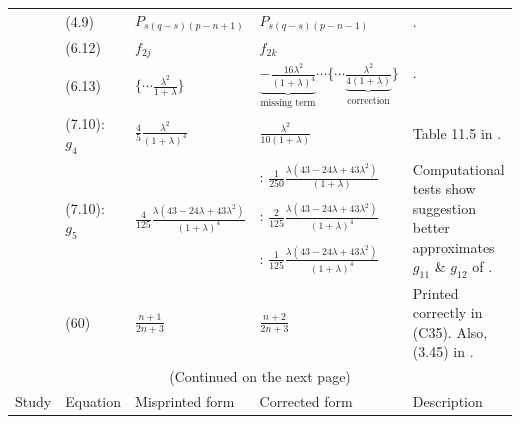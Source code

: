 \documentclass[../thesis.tex]{subfiles}
\begin{document}
\begin{landscape}
\begin{longtable}{p{3cm}p{3cm}p{5.0cm}p{5.25cm}p{5.5cm}}
 \multirow[t]{7}{3cm}{\cite{JO84}} & (4.9) & $P_{s(q-s)(p-n+1)}$ & $P_{s(q-s)(p-n-1)}$ & \cite{RWMG11,T17,I}.
 \\ \cline{2-5}
 & (6.12) & $f_{2j}$ & $f_{2k}$ & \multirow[c]{2}{5.5cm}{\cite{I}.}
 \\ \cline{2-4}
 & (6.13) & $\Big\{\cdots\frac{\lambda^2}{1+\lambda}\Big\}$ & $\underbrace{-\tfrac{16\lambda^2}{(1+\lambda)^4}}_\text{missing term}\cdots\Big\{\cdots\underbrace{\tfrac{\lambda^2}{4(1+\lambda)}}_\text{correction}\Big\}$ & 
 \\ \cline{2-5}
  & (7.10): $g_4$ & $\frac{4}{5}\frac{\lambda^2}{(1+\lambda)^4}$ & $\frac{\lambda^2}{10(1+\lambda)}$ & Table 11.5 in \cite{KK13}.
 \\ \cline{2-5}
 & \multirow[t]{3}{3cm}{(7.10): $g_5$} & \multirow[t]{3}{5.25cm}{$\frac{4}{125}\frac{\lambda(43-24\lambda+43\lambda^2)}{(1+\lambda)^4}$} & \cite{KK13}: $\frac{1}{250}\frac{\lambda(43-24\lambda+43\lambda^2)}{(1+\lambda)}$ & \multirow[t]{3}{5.5cm}{Computational tests show \cite{I} suggestion better approximates $g_{11}$ \& $g_{12}$ of \cite{ONM70}.} \\
 & & & \cite{L90}: $\frac{2}{125}\frac{\lambda(43-24\lambda+43\lambda^2)}{(1+\lambda)^4}$ & \\
 & & & \cite{I}: $\frac{1}{125}\frac{\lambda(43-24\lambda+43\lambda^2)}{(1+\lambda)^4}$ & 
 \\ \hline
 
 \cite{GMS20} & (60) & $\frac{n+1}{2n+3}$ & $\frac{n+2}{2n+3}$ & Printed correctly in (C35). Also, (3.45) in \cite{GCB66}.
 \\ \hline
 
 \multicolumn{5}{c}{(Continued on the next page)}%
 \\ \newpage \hline								 %
 Study & Equation & Misprinted form & Corrected  %
 form & Description \\ \hline					 %
 

\end{longtable}
\end{landscape}
\end{document}
